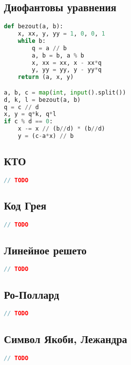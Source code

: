 \documentclass[10pt,a4paper,landscape,twosided]{extarticle}
\begin{document}
\begin{multicols*}{3}
\begin{lstlisting}[language=C++]
\end{lstlisting}

\subsection{Диофантовы уравнения}
\begin{lstlisting}[language=Python]
def bezout(a, b):
    x, xx, y, yy = 1, 0, 0, 1
    while b:
        q = a // b
        a, b = b, a % b
        x, xx = xx, x - xx*q
        y, yy = yy, y - yy*q
    return (a, x, y)

a, b, c = map(int, input().split())
d, k, l = bezout(a, b)
q = c // d
x, y = q*k, q*l
if c % d == 0:
    x -= x // (b//d) * (b//d)
    y = (c-a*x) // b

\end{lstlisting}

\subsection{КТО}
\begin{lstlisting}[language=C++]
// TODO

\end{lstlisting}

\subsection{Код Грея}
\begin{lstlisting}[language=C++]
// TODO

\end{lstlisting}

\subsection{Линейное решето}
\begin{lstlisting}[language=C++]
// TODO

\end{lstlisting}

\subsection{Ро-Поллард}
\begin{lstlisting}[language=C++]
// TODO

\end{lstlisting}

\subsection{Символ Якоби, Лежандра}
\begin{lstlisting}[language=C++]
// TODO


\end{lstlisting}
\end{multicols*}
\end{document}

